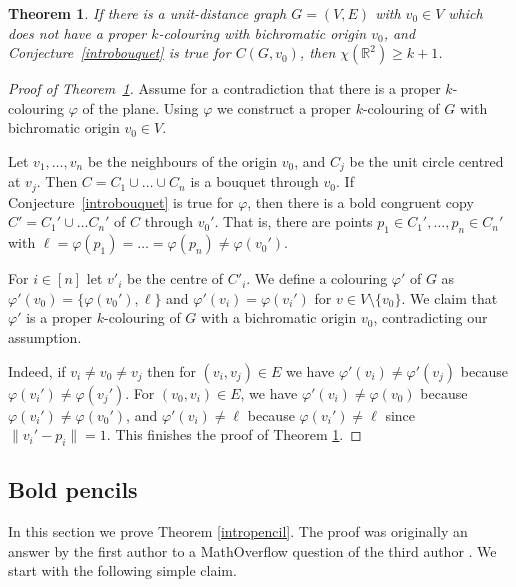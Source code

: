 \documentclass[12pt]{article}
\newcommand{\R}{{\mathbb R}}
\theoremstyle{plain}
\newtheorem{theorem}{Theorem}
\theoremstyle{definition}
\begin{document}
\begin{theorem}\label{human} If there is a unit-distance graph $G=(V,E)$ with $v_0\in V$ which does not have a proper $k$-colouring with bichromatic origin $v_0$, and Conjecture~\ref{introbouquet} is true for $C(G,v_0)$, then $\chi(\R^2)\geq k+1$.
\end{theorem}



\begin{proof}[Proof of Theorem~\ref{human}] Assume for a contradiction that there is a proper $k$-colouring $\varphi$ of the plane. Using $\varphi$ we construct a proper $k$-colouring of $G$ with bichromatic origin $v_0\in V$.


Let $v_1,\dots,v_n$ be the neighbours of the origin $v_0$, and $C_j$ be the unit circle centred at $v_j$. Then $C=C_1\cup\dots\cup C_n$ is a bouquet through $v_0$.
If Conjecture~\ref{introbouquet} is true for $\varphi$, then there is a bold congruent copy $C'=C_1'\cup\dots C_n'$ of $C$ through $v_0'$. That is, there are points $p_1\in C_1',\dots,p_n\in C_n'$ with $\ell=\varphi(p_1)=\dots=\varphi(p_n)\neq \varphi(v_0')$.



For $i\in [n]$ let $v'_i$ be the centre of $C'_i$. We define a colouring $\varphi'$ of $G$ as $\varphi'(v_0)=\{\varphi(v_0'),\ell\}$ and $\varphi'(v_i)=\varphi(v_i')$ for 
$v\in V\setminus\{v_0\}$.
We claim that $\varphi'$ is a proper $k$-colouring of $G$ with a bichromatic origin $v_0$, contradicting our assumption.


Indeed, if $v_i\ne v_0\ne v_j$ then for $(v_i,v_j)\in E$ we have $\varphi'(v_i)\ne \varphi'(v_j)$ because $\varphi(v_i')\ne \varphi(v_j')$.
For $(v_0,v_i)\in E$, we have $\varphi'(v_i)\ne \varphi(v_0)$ because $\varphi(v_i')\ne \varphi(v_0')$, and $\varphi'(v_i)\ne \ell$ because $\varphi(v_i')\ne \ell$ since $\|v_i'-p_i\|=1$.
This finishes the proof of Theorem \ref{human}.
\end{proof}




\subsection{Bold pencils}\label{41}


In this section we prove Theorem \ref{intropencil}. The proof was originally an answer by the first author to a MathOverflow question of the third author \cite{FN}. We start with the following simple claim.
\end{document}
